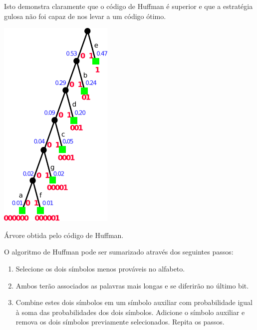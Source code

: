 \begin{example}
  Isto demonstra claramente que o código de Huffman é superior e que a estratégia gulosa
  não foi capaz de nos levar a um código ótimo.
  \begin{marginfigure}%
  \centering
  \includegraphics[width=0.7\linewidth]{figures/huffman.pdf}
  \caption{Árvore obtida pelo código de Huffman.}\label{fig:huffman}
  \end{marginfigure}
\end{example}


O algoritmo de Huffman pode ser sumarizado através dos seguintes passos:
\begin{enumerate}
\item Selecione os dois símbolos menos prováveis no alfabeto.
\item Ambos terão associados as palavras mais longas e se diferirão no último bit.
\item Combine estes dois símbolos em um símbolo auxiliar com probabilidade igual à soma das
        probabilidades dos dois símbolos. Adicione o símbolo auxiliar e remova os dois símbolos previamente selecionados.
        Repita os passos.
\end{enumerate}

